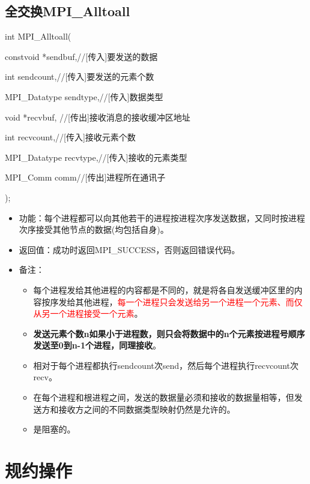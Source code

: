 \documentclass[UTF8]{article}%
\begin{document}
\subsection{全交换MPI\_Alltoall}

int MPI\_Alltoall(
    
    \qquad constvoid *sendbuf,//[传入]要发送的数据
    
    \qquad int sendcount,//[传入]要发送的元素个数
    
    \qquad MPI\_Datatype sendtype,//[传入]数据类型

    \qquad void *recvbuf, //[传出]接收消息的接收缓冲区地址

    \qquad int recvcount,//[传入]接收元素个数

    \qquad MPI\_Datatype recvtype,//[传入]接收的元素类型

    \qquad MPI\_Comm comm//[传出]进程所在通讯子
    
);

\begin{itemize}
    \item 功能：每个进程都可以向其他若干的进程按进程次序发送数据，又同时按进程次序接受其他节点的数据(均包括自身)。
    \item 返回值：成功时返回MPI\_SUCCESS，否则返回错误代码。
    \item 备注：
    
    {
        \begin{itemize}
            \item 每个进程发给其他进程的内容都是不同的，就是将各自发送缓冲区里的内容按序发给其他进程，\textcolor{red}{每一个进程只会发送给另一个进程一个元素、而仅从另一个进程接受一个元素}。
            \item \textbf{发送元素个数n如果小于进程数，则只会将数据中的n个元素按进程号顺序发送至0到n-1个进程，同理接收}。
            \item 相对于每个进程都执行sendcount次send，然后每个进程执行recvcount次recv。
            \item 在每个进程和根进程之间，发送的数据量必须和接收的数据量相等，但发送方和接收方之间的不同数据类型映射仍然是允许的。
            \item 是阻塞的。
        \end{itemize}
    }
    
\end{itemize}

\section{规约操作}
\end{document}
